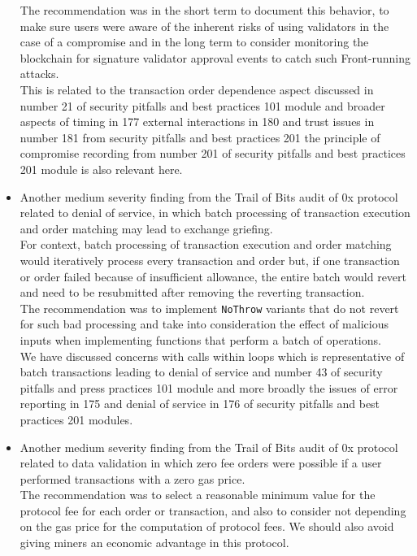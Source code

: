 \begin{itemize}
  The recommendation was in the short term to document this behavior, to
  make sure users were aware of the inherent risks of using validators
  in the case of a compromise and in the long term to consider
  monitoring the blockchain for signature validator approval events to
  catch such Front-running attacks.\\

  This is related to the transaction order dependence aspect discussed
  in number 21 of security pitfalls and best practices 101 module and
  broader aspects of timing in 177 external interactions in 180 and
  trust issues in number 181 from security pitfalls and best practices
  201 the principle of compromise recording from number 201 of security
  pitfalls and best practices 201 module is also relevant here.
\item
  Another medium severity finding from the Trail of Bits audit of 0x
  protocol related to denial of service, in which batch processing of
  transaction execution and order matching may lead to exchange
  griefing.\\

  For context, batch processing of transaction execution and order
  matching would iteratively process every transaction and order but, if
  one transaction or order failed because of insufficient allowance, the
  entire batch would revert and need to be resubmitted after removing
  the reverting transaction.\\

  The recommendation was to implement \texttt{NoThrow} variants that do
  not revert for such bad processing and take into consideration the
  effect of malicious inputs when implementing functions that perform a
  batch of operations.\\

  We have discussed concerns with calls within loops which is
  representative of batch transactions leading to denial of service and
  number 43 of security pitfalls and press practices 101 module and more
  broadly the issues of error reporting in 175 and denial of service in
  176 of security pitfalls and best practices 201 modules.
\item
  Another medium severity finding from the Trail of Bits audit of 0x
  protocol related to data validation in which zero fee orders were
  possible if a user performed transactions with a zero gas price.\\

  The recommendation was to select a reasonable minimum value for the
  protocol fee for each order or transaction, and also to consider not
  depending on the gas price for the computation of protocol fees. We
  should also avoid giving miners an economic advantage in this
  protocol.\\


\end{itemize}
